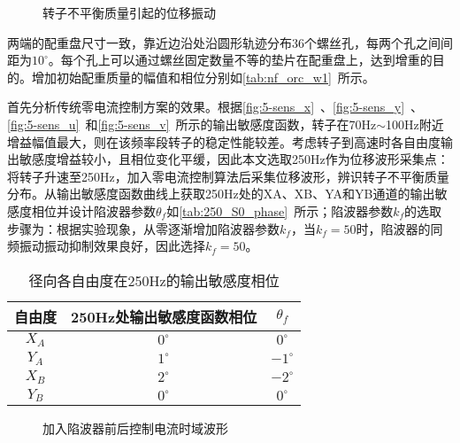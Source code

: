 \documentclass[
  lang=cn,
  degree=master,
  openany,oneside
]{nuaathesis}
\begin{document}
\begin{figure}[h!]  
	\quad  
	  		\caption{转子不平衡质量引起的位移振动}  \label{fig:5-s3-x-w0/w1}\end{figure}
	
两端的配重盘尺寸一致，靠近边沿处沿圆形轨迹分布36个螺丝孔，每两个孔之间间距为$10^{\circ}$。每个孔上可以通过螺丝固定数量不等的垫片在配重盘上，达到增重的目的。增加初始配重质量的幅值和相位分别如\autoref{tab:nf_orc_w1}~所示。

首先分析传统零电流控制方案的效果。根据\autoref{fig:5-sens_x}~、\autoref{fig:5-sens_y}~、\autoref{fig:5-sens_u}~和\autoref{fig:5-sens_v}~所示的输出敏感度函数，转子在70Hz$\sim$100Hz附近增益幅值最大，则在该频率段转子的稳定性能较差。考虑转子到高速时各自由度输出敏感度增益较小，且相位变化平缓，因此本文选取250Hz作为位移波形采集点：将转子升速至250Hz，加入零电流控制算法后采集位移波形，辨识转子不平衡质量分布。从输出敏感度函数曲线上获取250Hz处的XA、XB、YA和YB通道的输出敏感度相位并设计陷波器参数$\theta _f$如\autoref{tab:250_S0_phase}~所示；陷波器参数$k_f$的选取步骤为：根据实验现象，从零逐渐增加陷波器参数$k_f$，当$k_f = 50$时，陷波器的同频振动振动抑制效果良好，因此选择$k_f = 50$。

\begin{table}[h!]
  \caption[径向各自由度在250Hz的输出敏感度相位]{径向各自由度在250Hz的输出敏感度相位\label{tab:250_S0_phase}}
  \begin{tabular}{ccc}
    \toprule
    自由度 & 250Hz处输出敏感度函数相位 & $\theta _f$ \\
    \midrule
    $X_A$ & $0^{\circ}$ & $0^{\circ}$\\
    $Y_A$ & $1^{\circ}$ & $-1^{\circ}$\\
    $X_B$ & $2^{\circ}$ & $-2^{\circ}$\\
    $Y_B$ & $0^{\circ}$ & $0^{\circ}$\\
    \bottomrule
  \end{tabular}
\end{table}

\begin{figure}[h!]  
	\quad  
	\caption{加入陷波器前后控制电流时域波形}  \label{fig:5-s3-i-w1-pid_nf}\end{figure}
	
\end{document}
